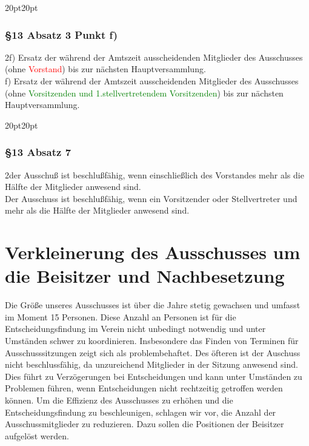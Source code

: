 \documentclass[10pt,a4paper,parskip=half]{scrartcl}
\newcommand{\new}[1]{\textcolor{Green}{#1}}
\newcommand{\old}[1]{\textcolor{Red}{#1}}
\newcommand{\change}[1]{
  \begin{adjustwidth}{20pt}{20pt}
    #1
  \end{adjustwidth}
}
\newcommand{\compare}[3]{\change{\subsubsection*{#1}\begin{multicols}{2}#2\columnbreak\\#3\end{multicols}}}
\begin{document}
    \compare{§13 Absatz 3 Punkt f)}
    {f) Ersatz der während der Amtszeit ausscheidenden Mitglieder des Ausschusses (ohne \old{Vorstand}) bis zur nächsten Hauptversammlung.}
    {f) Ersatz der während der Amtszeit ausscheidenden Mitglieder des Ausschusses (ohne \new{Vorsitzenden und 1.stellvertretendem Vorsitzenden}) bis zur nächsten Hauptversammlung.}

    \compare{§13 Absatz 7}
    {der Ausschuß ist beschlußfähig, wenn einschließlich des Vorstandes mehr als die Hälfte der Mitglieder anwesend sind.}
    {Der Ausschuss ist beschlußfähig, wenn ein Vorsitzender oder Stellvertreter und mehr als die Hälfte der Mitglieder anwesend sind.}



    \clearpage
  \section{Verkleinerung des Ausschusses um die Beisitzer und Nachbesetzung}
  Die Größe unseres Ausschusses ist über die Jahre stetig gewachsen und umfasst im Moment 15 Personen. Diese Anzahl an Personen ist für die Entscheidungsfindung im Verein nicht unbedingt notwendig und unter Umständen schwer zu koordinieren. Insbesondere das Finden von Terminen für Ausschusssitzungen zeigt sich als problembehaftet. Des öfteren ist der Auschuss nicht beschlussfähig, da unzureichend Mitglieder in der Sitzung anwesend sind. Dies führt zu Verzögerungen bei Entscheidungen und kann unter Umständen zu Problemen führen, wenn Entscheidungen nicht rechtzeitig getroffen werden können. Um die Effizienz des Ausschusses zu erhöhen und die Entscheidungsfindung zu beschleunigen, schlagen wir vor, die Anzahl der Ausschussmitglieder zu reduzieren. Dazu sollen die Positionen der Beisitzer aufgelöst werden.
\end{document}
